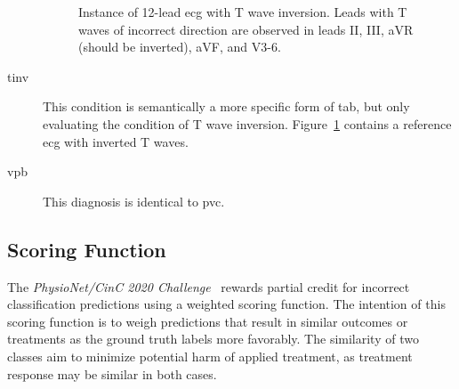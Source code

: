 \documentclass[\main/thesis.tex]{subfiles}
\begin{document}
\begin{description}
    \begin{figure}[ht]
        \centering
        \caption{Instance of 12-lead \gls{ecg} with T wave inversion. Leads with T waves of incorrect direction are observed in leads II, III, aVR (should be inverted), aVF, and V3-6.}
        \label{fig:full_TInv}
    \end{figure}
    \item[\gls{tinv}] This condition is semantically a more specific form of \gls{tab}, but only evaluating the condition of T wave inversion.
    Figure~\ref{fig:full_TInv} contains a reference \gls{ecg} with inverted T waves.

    \item[\gls{vpb}] This diagnosis is identical to \gls{pvc}.
\end{description}

\subsection{Scoring Function}

The \emph{PhysioNet/CinC 2020 Challenge}~\cite{physionet_challenge_2020} rewards partial credit for incorrect classification predictions using a weighted scoring function.
The intention of this scoring function is to weigh predictions that result in similar outcomes or treatments as the ground truth labels more favorably.
The similarity of two classes aim to minimize potential harm of applied treatment, as treatment response may be similar in both cases.
\end{document}
